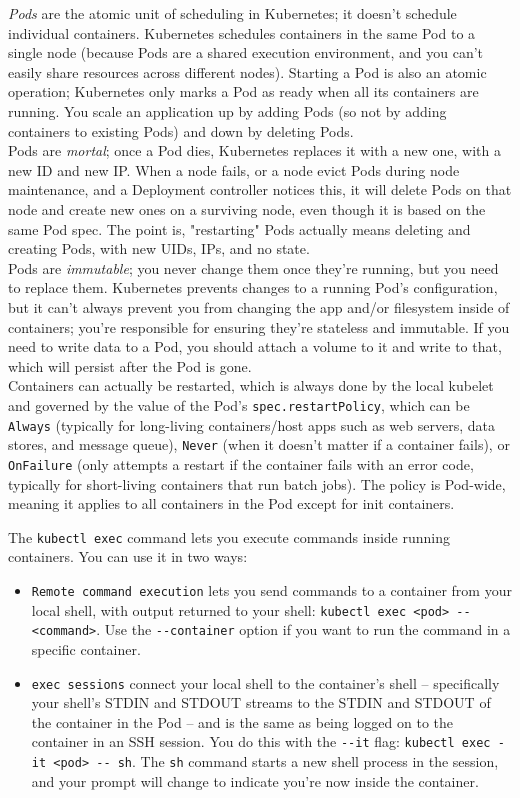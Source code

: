 \documentclass[8pt, table, xcdraw]{article}%
\begin{document}
\emph{Pods} are the atomic unit of scheduling in Kubernetes; it doesn't schedule individual containers. Kubernetes schedules containers in the same Pod to a single node (because Pods are a shared execution environment, and you can’t easily share resources across different nodes). Starting a Pod is also an atomic operation; Kubernetes only marks a Pod as ready when all its containers are running. You scale an application up by adding Pods (so not by adding containers to existing Pods) and down by deleting Pods.\\
Pods are \emph{mortal}; once a Pod dies, Kubernetes replaces it with a new one, with a new ID and new IP. When a node fails, or a node evict Pods during node maintenance, and a Deployment controller notices this, it will delete Pods on that node and create new ones on a surviving node, even though it is based on the same Pod spec. The point is, "restarting" Pods actually means deleting and creating Pods, with new UIDs, IPs, and no state.\\
Pods are \emph{immutable}; you never change them once they’re running, but you need to replace them. Kubernetes prevents changes to a running Pod’s configuration, but it can’t always prevent you from changing the app and/or filesystem inside of containers; you’re responsible for ensuring they're stateless and immutable. If you need to write data to a Pod, you should attach a volume to it and write to that, which will persist after the Pod is gone.\\
Containers can actually be restarted, which is always done by the local kubelet and governed by the value of the Pod’s \lstinline{spec.restartPolicy}, which can be \lstinline{Always} (typically for long-living containers/host apps such as web servers, data stores, and message queue), \lstinline{Never} (when it doesn't matter if a container fails), or \lstinline{OnFailure} (only attempts a restart if the container fails with an error code, typically for short-living containers that run batch jobs). The policy is Pod-wide, meaning it applies to all containers in the Pod except for init containers.

The \lstinline{kubectl exec} command lets you execute commands inside running containers. You can use it in two ways:

\begin{itemize}
	\item \lstinline{Remote command execution} lets you send commands to a container from your local shell, with output returned to your shell: \lstinline{kubectl exec <pod> -- <command>}. Use the \lstinline{--container} option if you want to run the command in a specific container.
	\item \lstinline{exec sessions} connect your local shell to the container’s shell -- specifically your shell’s STDIN and STDOUT streams to the STDIN and STDOUT of the container in the Pod -- and is the same as being logged on to the container in an SSH session. You do this with the \lstinline{--it} flag: \lstinline{kubectl exec -it <pod> -- sh}. The \lstinline{sh} command starts a new shell process in the session, and your prompt will change to indicate you’re now inside the container.
\end{itemize}
\end{document}
